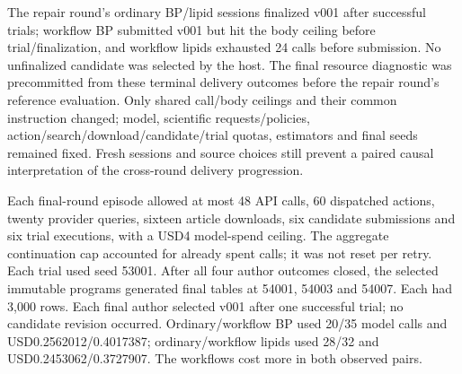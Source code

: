 \documentclass[11pt,letterpaper]{article}
\begin{document}
\endgroup

The repair round's ordinary BP/\allowbreak{}lipid sessions finalized v001 after successful trials; workflow BP submitted v001 but hit the body ceiling before trial/\allowbreak{}finalization, and workflow lipids exhausted 24 calls before submission. No unfinalized candidate was selected by the host. The final resource diagnostic was precommitted from these terminal delivery outcomes before the repair round's reference evaluation. Only shared call/\allowbreak{}body ceilings and their common instruction changed; model, scientific requests/\allowbreak{}policies, action/\allowbreak{}search/\allowbreak{}download/\allowbreak{}candidate/\allowbreak{}trial quotas, estimators and final seeds remained fixed. Fresh sessions and source choices still prevent a paired causal interpretation of the cross-round delivery progression.


Each final-round episode allowed at most 48 API calls, 60 dispatched actions, twenty provider queries, sixteen article downloads, six candidate submissions and six trial executions, with a USD4 model-spend ceiling. The aggregate continuation cap accounted for already spent calls; it was not reset per retry. Each trial used seed 53001. After all four author outcomes closed, the selected immutable programs generated final tables at 54001, 54003 and 54007. Each had 3,000 rows. Each final author selected v001 after one successful trial; no candidate revision occurred. Ordinary/\allowbreak{}workflow BP used 20/\allowbreak{}35 model calls and USD0.2562012/\allowbreak{}0.4017387; ordinary/\allowbreak{}workflow lipids used 28/\allowbreak{}32 and USD0.2453062/\allowbreak{}0.3727907. The workflows cost more in both observed pairs.


\FloatBarrier

\begingroup

\small

\renewcommand{\arraystretch}{1.22}
\end{document}

